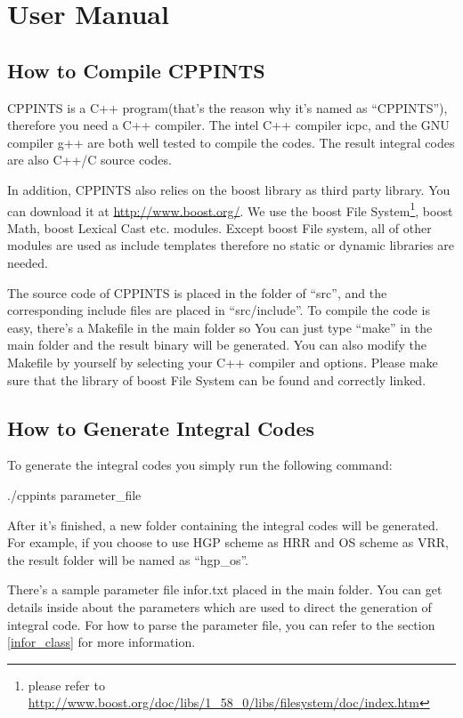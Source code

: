 %
% 
%
\chapter{User Manual}



\section{How to Compile CPPINTS}
%
%
CPPINTS is a C++ program(that's the reason why it's named as ``CPPINTS''), 
therefore you need a C++ compiler. The intel C++ compiler icpc, and the 
GNU compiler g++ are both well tested to compile the codes. The result
integral codes are also C++/C source codes.

In addition, CPPINTS also relies on the boost library as third party 
library. You can download it at \url{http://www.boost.org/}. We use 
the boost File System\footnote{please refer to 
\url{http://www.boost.org/doc/libs/1_58_0/libs/filesystem/doc/index.htm}},
boost Math, boost Lexical Cast etc. modules. Except boost File system,
all of other modules are used as include templates therefore no static or 
dynamic libraries are needed.

The source code of CPPINTS is placed in the folder of ``src'', and the 
corresponding include files are placed in ``src/include''. To compile
the code is easy, there's a Makefile in the main folder so You 
can just type ``make'' in the main folder and the result binary 
will be generated. You can also modify the Makefile by yourself by 
selecting your C++ compiler and options. Please make sure that the library
of boost File System can be found and correctly linked. 

\section{How to Generate Integral Codes}
%
%
%
To generate the integral codes you simply run the following command:
\begin{center}
 ./cppints parameter\_file
\end{center}
After it's finished, a new folder containing the integral codes will be 
generated. For example, if you choose to use HGP scheme as HRR and OS
scheme as VRR, the result folder will be named as ``hgp\_os''.

There's a sample parameter file infor.txt placed in the main folder.
You can get details inside about the parameters which are used to direct the 
generation of integral code. For how to parse the parameter file,
you can refer to the section  \ref{infor_class} for more information.

